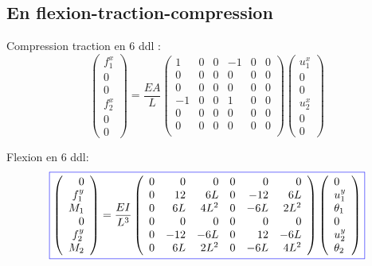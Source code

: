 \documentclass[a4paper]{article}
\newcommand{\myredbox}[1]{\fcolorbox{blue}{white}{$\displaystyle#1$}}
\begin{document}
  \subsection{En flexion-traction-compression}
 Compression traction en 6 ddl :
\[\left(\begin{array}{l} 
f_{1}^x\\0\\0\\f_{2}^x\\0\\0
\end{array}\right) = \frac{EA}{L}\left(\begin{array}{rrrrrr} 
1&0&0&-1&0&0\\
0&0&0&0&0&0\\
0&0&0&0&0&0\\
-1&0&0&1&0&0\\
0&0&0&0&0&0\\
0&0&0&0&0&0\\
\end{array}\right) \left(\begin{array}{l} 
u_{1}^x\\0\\0\\u_{2}^x\\0\\0
\end{array}\right) \]

Flexion en 6 ddl:
\[\myredbox{\left(\begin{array}{r} 
0\\f_{1}^y\\M_1\\0\\f_{2}^y\\M_2
\end{array}\right)=\frac{EI}{L^3}\left(\begin{array}{rrrrrr} 
0&0&0&0&0&0\\
0&12&6L&0&-12&6L\\
0&6L&4L^2&0&-6L&2L^2\\
0&0&0&0&0&0\\
0&-12&-6L&0&12&-6L\\
0&6L&2L^2&0&-6L&4L^2
\end{array}\right) \left(\begin{array}{l} 
0\\u_{1}^y\\\theta_1\\0\\u_{2}^y\\\theta_2
\end{array}\right)} 
\] 
  
\end{document}
